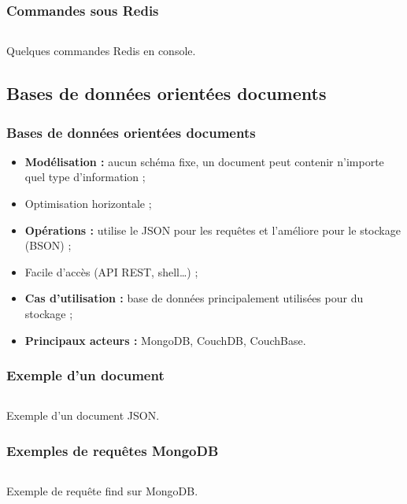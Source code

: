 	\begin{frame}
		\frametitle{Commandes sous Redis}

		\begin{listing}[H]
			\inputminted[fontsize=\tiny, linenos=true]{text}{code/commandesRedis.txt}
			\caption{Quelques commandes Redis en console.}
		\end{listing}
	\end{frame}

	\subsection{Bases de données orientées documents}
	\begin{frame}
		\frametitle{Bases de données orientées documents}

		\begin{itemize}
			\item \textbf{Modélisation :} aucun schéma fixe, un document peut contenir n'importe quel type d'information ;
			\item Optimisation horizontale ;
			\item \textbf{Opérations :} utilise le JSON pour les requêtes et l'améliore pour le stockage (BSON) ;
			\item Facile d'accès (API REST, shell\dots) ;
			\item \textbf{Cas d'utilisation :} base de données principalement utilisées pour du stockage ;
			\item \textbf{Principaux acteurs :} MongoDB, CouchDB, CouchBase.
		\end{itemize}
	\end{frame}

	\begin{frame}
		\frametitle{Exemple d'un document}

		\begin{listing}[H]
			\inputminted[fontsize=\tiny, linenos=true]{json}{code/exemple-document.json}
			\caption{Exemple d'un document JSON.}
		\end{listing}
	\end{frame}

	\begin{frame}
		\frametitle{Exemples de requêtes MongoDB}

		\begin{listing}[H]
			\inputminted{javascript}{code/requeteMongoFind.js}
			\caption{Exemple de requête find sur MongoDB.}
			\label{findMongoDB}
		\end{listing}
	\end{frame}

